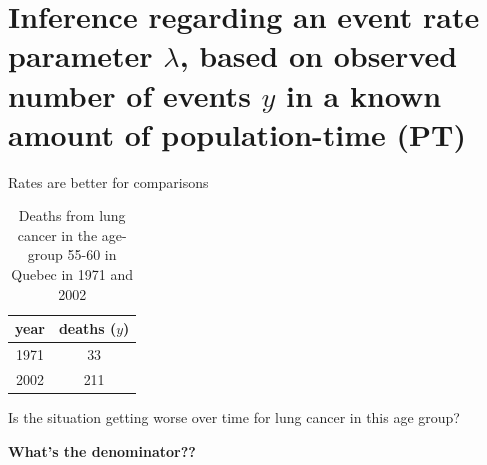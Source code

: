 \documentclass[10pt]{beamer}\usepackage[]{graphicx}\usepackage[]{color}
\begin{document}
\section{Inference regarding an event rate parameter $\lambda$, based on observed number of events $y$ in a known amount of population-time (PT)}

\begin{frame}{Rates are better for comparisons}
	
	
	\begin{table}
		\centering
		\begin{tabular}{cc}
			year & deaths ($y$) \\
			\hline
			1971 & 33 \\
			2002 & 211 \\
			\hline
		\end{tabular}
		\caption{Deaths from lung cancer in the age-group 55-60 in Quebec in 1971 and 2002}
	\end{table} 
	
	\pause 
	
	 Is the situation getting worse over time for lung cancer in this age group?
	\pause
	
	\vspace*{0.5in}
	
	 \textbf{What's the denominator??}
	
	
\end{frame} 



\begin{frame}
\end{frame}
\end{document}
